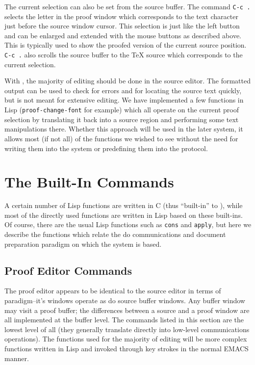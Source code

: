 The current selection can also be set from the source buffer.  The command
{\tt C-c .} selects the letter in the proof window which corresponds to the
text character just before the source window cursor.  This selection is
just like the left button and can be enlarged and extended with the mouse
buttons as described above.  This is typically used to show the proofed
version of the current source position.  {\tt C-c .} also scrolls the source
buffer to the {\TeX} source which corresponds to the current selection.

With {\VorTeX}, the majority of editing should be done in the source editor.
The formatted output can be used to check for errors and for locating the
source text quickly, but is not meant for extensive editing.  We have
implemented a few functions in Lisp ({\tt proof-change-font} for example)
which all operate on the current proof selection by translating it back
into a source region and performing some text manipulations there.  Whether
this approach will be used in the later system, it allows most (if not all)
of the functions we wished to see without the need for writing them into
the system or predefining them into the protocol.


\section{The Built-In Commands}

A certain number of Lisp functions are written in C (thus ``built-in'' to
{\VorTeX}), while most of the directly used functions are written in Lisp
based on these built-ins.  Of course, there are the usual Lisp functions
such as {\tt cons} and {\tt apply}, but here we describe the functions
which relate the do communications and document preparation paradigm on
which the system is based.


\subsection{Proof Editor Commands}

The proof editor appears to be identical to the source editor in terms
of paradigm--it's windows operate as do source buffer windows.  Any
{\VorTeX} buffer window may visit a proof buffer; the differences
between a source and a proof window are all implemented at the buffer
level.  The commands listed in this section are the lowest level of
all (they generally translate directly into low-level communications
operations).  The functions used for the majority of editing will be
more complex functions written in Lisp and invoked through key strokes
in the normal EMACS manner.

